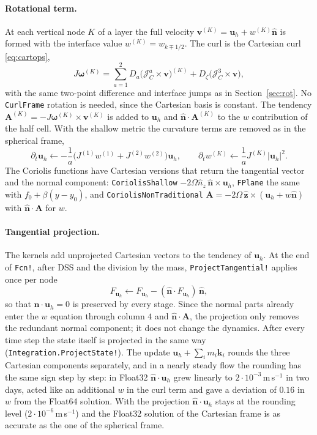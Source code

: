 \documentclass[11pt,a4paper]{article}
\newcommand{\vv}{\bm{v}}
\newcommand{\Jm}{\mathcal{J}}
\newcommand{\code}[1]{\texttt{#1}}
\begin{document}
\paragraph{Rotational term.}
At each vertical node $K$ of a layer the full velocity
$\vv^{(K)} = \bm u_h + w^{(K)}\hat{\bm n}$ is formed with the interface value
$w^{(K)} = w_{k\mp1/2}$. The curl is the Cartesian curl \eqref{eq:cartops},
\begin{equation}
  J\bm\omega^{(K)} = \sum_{a=1}^2 D_a\bigl(\Jm^a_C\times\vv\bigr)^{(K)}
   + D_\zeta\bigl(\Jm^3_C\times\vv\bigr),
\end{equation}
with the same two-point difference and interface jumps as in
Section~\ref{sec:rot}. No \code{CurlFrame} rotation is needed, since the
Cartesian basis is constant. The tendency
$\bm A^{(K)} = -J\bm\omega^{(K)}\times\vv^{(K)}$ is added to $\bm u_h$ and
$\hat{\bm n}\cdot\bm A^{(K)}$ to the $w$ contribution of the half cell. With
the shallow metric the curvature terms are removed as in the spherical
frame,
\begin{equation}
  \partial_t\bm u_h \leftarrow -\frac{1}{a}\bigl(J^{(1)}w^{(1)} + J^{(2)}w^{(2)}\bigr)\bm u_h,
  \qquad
  \partial_t w^{(K)} \leftarrow \frac{1}{a}J^{(K)}|\bm u_h|^2 .
\end{equation}
The Coriolis functions have Cartesian versions that return the
tangential vector and the normal component:
\code{CoriolisShallow} $-2\Omega\hat n_z\,\hat{\bm n}\times\bm u_h$, \code{FPlane}
the same with $f_0+\beta(y-y_0)$, and \code{CoriolisNonTraditional}
$\bm A = -2\Omega\,\hat{\bm z}\times(\bm u_h + w\hat{\bm n})$ with
$\hat{\bm n}\cdot\bm A$ for $w$.

\paragraph{Tangential projection.}
The kernels add unprojected Cartesian vectors to the tendency of $\bm u_h$.
At the end of \code{Fcn!}, after DSS and the division by the mass,
\code{ProjectTangential!} applies once per node
\begin{equation}
  F_{\bm u_h} \leftarrow F_{\bm u_h} - (\hat{\bm n}\cdot F_{\bm u_h})\,\hat{\bm n},
\end{equation}
so that $\hat{\bm n}\cdot\bm u_h = 0$ is preserved by every stage. Since the
normal parts already enter the $w$ equation through column $4$ and
$\hat{\bm n}\cdot\bm A$, the projection only removes the redundant normal
component; it does not change the dynamics. After every time step the state
itself is projected in the same way (\code{Integration.ProjectState!}). The
update $\bm u_h + \sum_i m_i\bm k_i$ rounds the three Cartesian components
separately, and in a nearly steady flow the rounding has the same sign step by
step: in Float32 $\hat{\bm n}\cdot\bm u_h$ grew linearly to $2\cdot10^{-3}\,$m\,s$^{-1}$
in two days, acted like an additional $w$ in the curl term and gave a
deviation of $0.16$ in $w$ from the Float64 solution. With the projection
$\hat{\bm n}\cdot\bm u_h$ stays at the rounding level ($2\cdot10^{-6}\,$m\,s$^{-1}$) and
the Float32 solution of the Cartesian frame is as accurate as the one of the
spherical frame.
\end{document}
